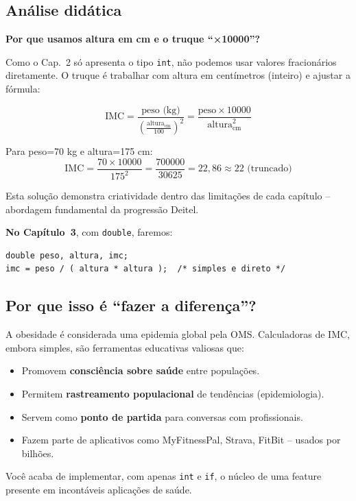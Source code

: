 \documentclass[12pt,a4paper]{article}
\begin{document}
\subsection*{Análise didática}

\begin{atencao}
\textbf{Por que usamos altura em cm e o truque ``×10000''?}

Como o Cap.~2 só apresenta o tipo \texttt{int}, não podemos usar valores fracionários
diretamente. O truque é trabalhar com altura em centímetros (inteiro) e ajustar a
fórmula:

\[
\text{IMC} = \frac{\text{peso (kg)}}{\left(\frac{\text{altura}_\text{cm}}{100}\right)^2} = \frac{\text{peso} \times 10000}{\text{altura}_\text{cm}^2}
\]

Para peso=70 kg e altura=175 cm:
\[
\text{IMC} = \frac{70 \times 10000}{175^2} = \frac{700000}{30625} = 22{,}86 \approx 22 \text{ (truncado)}
\]

Esta solução demonstra criatividade dentro das limitações de cada capítulo --
abordagem fundamental da progressão Deitel.

\textbf{No Capítulo~3}, com \texttt{double}, faremos:
\begin{lstlisting}
double peso, altura, imc;
imc = peso / ( altura * altura );  /* simples e direto */
\end{lstlisting}
\end{atencao}

\subsection*{Por que isso é ``fazer a diferença''?}

\begin{tcolorbox}[colback=ecolightgreen,colframe=ecogreen,
  title={\bfseries Tecnologia a serviço da saúde}]

A obesidade é considerada uma epidemia global pela OMS. Calculadoras de IMC,
embora simples, são ferramentas educativas valiosas que:

\begin{itemize}[noitemsep]
  \item Promovem \textbf{consciência sobre saúde} entre populações.
  \item Permitem \textbf{rastreamento populacional} de tendências (epidemiologia).
  \item Servem como \textbf{ponto de partida} para conversas com profissionais.
  \item Fazem parte de aplicativos como MyFitnessPal, Strava, FitBit -- usados
  por bilhões.
\end{itemize}

Você acaba de implementar, com apenas \texttt{int} e \texttt{if}, o núcleo de
uma feature presente em incontáveis aplicações de saúde.
\end{tcolorbox}
\end{document}
